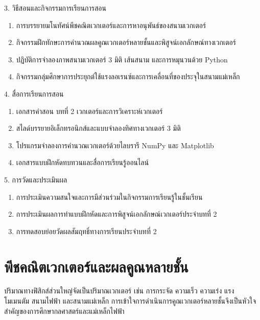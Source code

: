 \newpage

\begin{planbox}[colframe=rbruNavy!85!black, colbacktitle=rbruNavy!85!black]{3. วิธีสอนและกิจกรรมการเรียนการสอน}
\begin{enumerate}[topsep=2pt, itemsep=1pt, partopsep=0pt, parsep=0pt, leftmargin=1.5em]
    \item การบรรยายมโนทัศน์พีชคณิตเวกเตอร์และการหาอนุพันธ์ของสนามเวกเตอร์
    \item กิจกรรมฝึกทักษะการคำนวณผลคูณเวกเตอร์หลายชั้นและพิสูจน์เอกลักษณ์ทางเวกเตอร์
    \item ปฏิบัติการจำลองภาพสนามเวกเตอร์ 3 มิติ เส้นสนาม และการหมุนวนด้วย Python
    \item กิจกรรมกลุ่มศึกษาการประยุกต์ใช้แรงลอเรนซ์และการเคลื่อนที่ของประจุในสนามแม่เหล็ก
\end{enumerate}
\end{planbox}

\begin{planbox}[colframe=rbruGold!90!black, colbacktitle=rbruGold!90!black]{4. สื่อการเรียนการสอน}
\begin{enumerate}[topsep=2pt, itemsep=1pt, partopsep=0pt, parsep=0pt, leftmargin=1.5em]
    \item เอกสารคำสอน บทที่ 2 เวกเตอร์และการวิเคราะห์เวกเตอร์
    \item สไลด์บรรยายอิเล็กทรอนิกส์และแบบจำลองทิศทางเวกเตอร์ 3 มิติ
    \item โปรแกรมจำลองการคำนวณเวกเตอร์ด้วยไลบรารี NumPy และ Matplotlib
    \item เอกสารแบบฝึกหัดทบทวนและสื่อการเรียนรู้ออนไลน์
\end{enumerate}
\end{planbox}

\begin{planbox}[colframe=rbruSlate, colbacktitle=rbruSlate]{5. การวัดและประเมินผล}
\begin{enumerate}[topsep=2pt, itemsep=1pt, partopsep=0pt, parsep=0pt, leftmargin=1.5em]
    \item การประเมินความสนใจและการมีส่วนร่วมในกิจกรรมการเรียนรู้ในชั้นเรียน
    \item การประเมินผลการทำแบบฝึกหัดและการพิสูจน์เอกลักษณ์เวกเตอร์ประจำบทที่ 2
    \item การทดสอบย่อยวัดผลสัมฤทธิ์ทางการเรียนประจำบทที่ 2
\end{enumerate}
\end{planbox}
\clearpage

\section{พีชคณิตเวกเตอร์และผลคูณหลายชั้น}
ปริมาณทางฟิสิกส์ส่วนใหญ่จัดเป็นปริมาณเวกเตอร์ เช่น การกระจัด ความเร็ว ความเร่ง แรง โมเมนตัม สนามไฟฟ้า และสนามแม่เหล็ก การเข้าใจการดำเนินการคูณเวกเตอร์หลายชั้นจึงเป็นหัวใจสำคัญของการศึกษากลศาสตร์และแม่เหล็กไฟฟ้า

